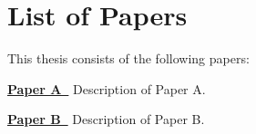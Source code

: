 \chapter*{List of Papers}

This thesis consists of the following papers:

\hyperref[chap:appa]{\textbf{Paper A~}}
Description of Paper A.

\hyperref[chap:appb]{\textbf{Paper B~}}
Description of Paper B.